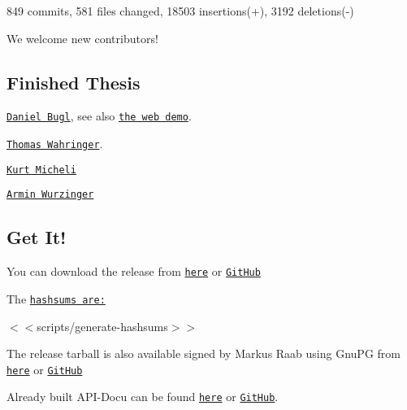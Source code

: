 849 commits, 581 files changed, 18503 insertions(+), 3192 deletions(-\/)

We welcome new contributors!

\subsection*{Finished Thesis}


\begin{DoxyItemize}
\item \href{https://www.libelektra.org/ftp/elektra/publications/bugl2018web.pdf}{\tt Daniel Bugl}, see also \href{https://webdemo.libelektra.org/}{\tt the web demo}.
\item \href{https://www.libelektra.org/ftp/elektra/publications/wahringer2018notification.pdf}{\tt Thomas Wahringer}.
\item \href{https://www.libelektra.org/ftp/elektra/publications/micheli2018hybrid.pdf}{\tt Kurt Micheli}
\item \href{https://catalogplus.tuwien.ac.at/primo_library/libweb/action/display.do?tabs=detailsTab&ct=display&fn=search&doc=UTW_alma7181921030003336&indx=1&recIds=UTW_alma7181921030003336}{\tt Armin Wurzinger}
\end{DoxyItemize}

\subsection*{Get It!}

You can download the release from \href{https://www.libelektra.org/ftp/elektra/releases/elektra-0.8.25.tar.gz}{\tt here} or \href{https://github.com/ElektraInitiative/ftp/blob/master/releases/elektra-0.8.25.tar.gz?raw=true}{\tt Git\+Hub}

The \href{https://github.com/ElektraInitiative/ftp/blob/master/releases/elektra-0.8.25.tar.gz.hashsum?raw=true}{\tt hashsums are\+:}

$<$$<${\ttfamily scripts/generate-\/hashsums}$>$$>$

The release tarball is also available signed by Markus Raab using Gnu\+PG from \href{https://www.libelektra.org/ftp/elektra/releases/elektra-0.8.25.tar.gz.gpg}{\tt here} or \href{https://github.com/ElektraInitiative/ftp/blob/master/releases//elektra-0.8.25.tar.gz.gpg?raw=true}{\tt Git\+Hub}

Already built A\+P\+I-\/\+Docu can be found \href{https://doc.libelektra.org/api/0.8.25/html/}{\tt here} or \href{https://github.com/ElektraInitiative/doc/tree/master/api/0.8.25}{\tt Git\+Hub}.

